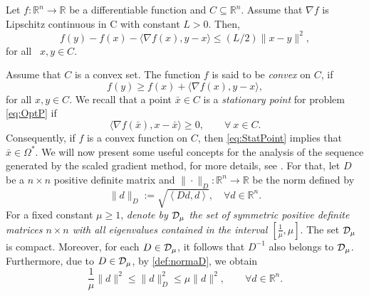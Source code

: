 \begin{lemma} \label{Le:derivlipsch}
	Let $f:\mathbb{R}^n \to \mathbb{R}$ be a differentiable function and $C \subseteq \mathbb{R}^n$. Assume that $\nabla f$  is Lipschitz continuous in C with constant $L>0$. Then,
	\[
		f(y) - f(x) - \langle \nabla f(x), y-x \rangle \leq (L/2)\|x-y\|^2,
	\]
	for all~ $x, y\in C$.
\end{lemma}
Assume that $C$ is a convex set. The function $f$ is said to be \textit{convex} on $C$, if
\[
	f(y) \geq  f(x) + \langle \nabla f(x), y-x \rangle,
\]
for all $x, y\in C$. We recall  that a point ${\bar{x}} \in C$ is a {\it stationary point} for problem \eqref{eq:OptP} if
\begin{equation} \label{eq:StatPoint}
	\langle \nabla f({\bar{x}}),  x-{\bar{x}}\rangle \geq 0, \qquad \forall ~ x\in  C.
\end{equation}
Consequently, if $f$ is a convex function  on $C$, then  \eqref{eq:StatPoint} implies that  $\bar{x} \in \Omega^*$.  We will now present some useful concepts  for the analysis of the sequence generated by the scaled  gradient method, for more details, see \cite{CombettesVu2013}.    For that,  let  $D$ be a $n\times n$ positive definite matrix and $\| \cdot \|_{D} : \mathbb{R}^{n}\rightarrow \mathbb{R}$ be  the norm  defined by
\begin{equation} \label{def:normaD}
	\|d\|_{D}:=\sqrt{\left\langle D d,d\right\rangle},\quad \forall d\in \mathbb{R}^{n}.
\end{equation}
For a fixed  constant $\mu \geq 1$,  {\it denote by  ${\cal D}_{\mu}$  the set of symmetric positive definite matrices $n\times n$ with all eigenvalues contained in the interval $[\frac{1}{\mu}, \mu]$}.  The set ${\cal D}_{\mu}$   is compact. Moreover,  for each $D\in {\cal D}_{\mu}$, it follows that $D^{-1}$ also belongs to $ {\cal D}_{\mu}$. Furthermore,  due to $D\in {\cal D}_{\mu}$,  by \eqref{def:normaD}, we obtain
\begin{equation} \label{eq:pnv}
	\frac{1}{\mu}\|d\|^2\leq \|d\|^2_{D}\leq \mu \|d\|^2, \qquad \forall d\in \mathbb{R}^n.
\end{equation}

